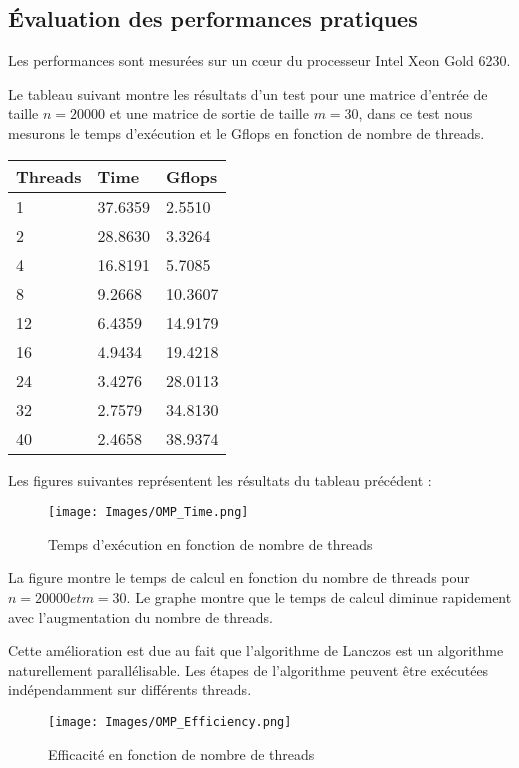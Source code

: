 \documentclass[11pt,french]{article}
\begin{document}
	\subsection{Évaluation des performances pratiques}
    Les performances sont mesurées sur un cœur du processeur Intel Xeon Gold 6230.

    Le tableau suivant montre les résultats d'un test pour une matrice d'entrée de taille $n=20000$ et une matrice de sortie de taille $m=30$, dans ce test nous mesurons le temps d'exécution et le Gflops en fonction de nombre de threads.
    \begin{table}[htbp]

    \centering
    \begin{tabular}{ |p{3cm}|p{3cm}|p{3cm}|  }
    \hline
    Threads & Time & Gflops \\
    \hline
     1  &  37.6359  &   2.5510\\
     2  &  28.8630  &   3.3264\\
     4  &  16.8191  &   5.7085\\
     8  &   9.2668  &  10.3607\\
    12  &   6.4359  &  14.9179\\
    16  &   4.9434  &  19.4218\\
    24  &   3.4276  &  28.0113\\
    32  &   2.7579  &  34.8130\\
    40  &   2.4658  &  38.9374\\
    \hline
    \end{tabular}
    \end{table}

    Les figures suivantes représentent les résultats du tableau précédent :
    \begin{figure}[h]
    \centering
    \texttt{[image: Images/OMP\_Time.png]}
    \caption{Temps d'exécution en fonction de nombre de threads}
    \label{fig:mesh1}
    \end{figure}
    \FloatBarrier
    
    La figure montre le temps de calcul en fonction du nombre de threads pour $n = 20000 et m = 30$. Le graphe montre que le temps de calcul diminue rapidement avec l'augmentation du nombre de threads.
    
    Cette amélioration est due au fait que l'algorithme de Lanczos est un algorithme naturellement parallélisable. Les étapes de l'algorithme peuvent être exécutées indépendamment sur différents threads.
    \begin{figure}[h]
    \centering
    \texttt{[image: Images/OMP\_Efficiency.png]}
    \caption{Efficacité en fonction de nombre de threads}
    \label{fig:mesh1}
    \end{figure}
    \FloatBarrier
    
\end{document}
